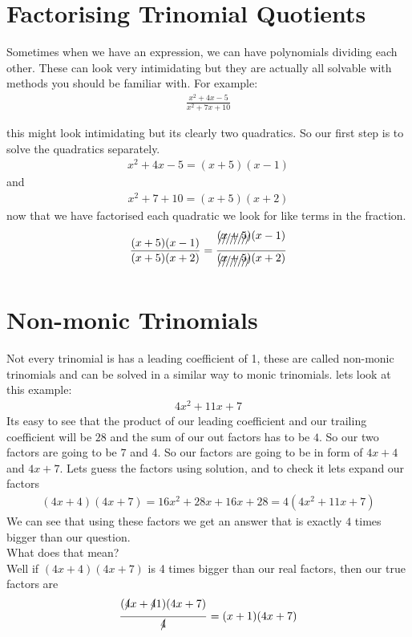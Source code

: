 \documentclass{article}
\begin{document}
\section*{Factorising Trinomial Quotients}
Sometimes when we have an expression, we can have polynomials dividing each other. These can look very intimidating but they are actually all solvable with methods you should be familiar with. For example:
\begin{align*}
    \frac{x^2 + 4x -5}{x^2 + 7x + 10}
\end{align*}

this might look intimidating but its clearly two quadratics. So our first step is to solve the quadratics separately.
\begin{align*}
    x^2+4x - 5  = (x+5)(x-1)
\end{align*}
and
\begin{align*}
    x^2 +7 + 10 = (x+5)(x+2)
\end{align*}
now that we have factorised each \gls{quadratic} we look for like terms in the fraction.
\begin{align*}
     \frac{ (x+5)(x-1)}{(x+5)(x+2)} = \frac{ \xout{(x+5)}(x-1)}{\xout{(x+5)}(x+2)}
\end{align*}
\section{Non-monic Trinomials}
Not every trinomial is has a leading coefficient of 1, these are called non-monic trinomials and can be solved in a similar way to monic trinomials. lets look at this example:
\begin{align*}
    4x^2 + 11x + 7
\end{align*}
Its easy to see that the product of our leading coefficient and our trailing coefficient will be $28$ and the sum of our out factors has to be $4$. So our two factors are going to be $7$ and $4$. So our factors are going to be in form of $4x+4$ and $4x+7$. Lets guess the factors using solution, and to check it lets expand our factors
\begin{align*}
    (4x+4)(4x+7) = 16x^2 + 28x+ 16x+ 28 = 4(4x^2 + 11x + 7)
\end{align*}
We can see that using these factors we get an answer that is exactly $4$ times bigger than our question.\\
What does that mean?\\
Well if $(4x+4)(4x+7)$ is 4 times bigger than our real factors, then our true factors are 
\begin{align*}
    \frac{(\xout{4}x+\xout{4}1)(4x+7)}{\xout{4}} = (x+1)(4x+7)
\end{align*}
\end{document}
